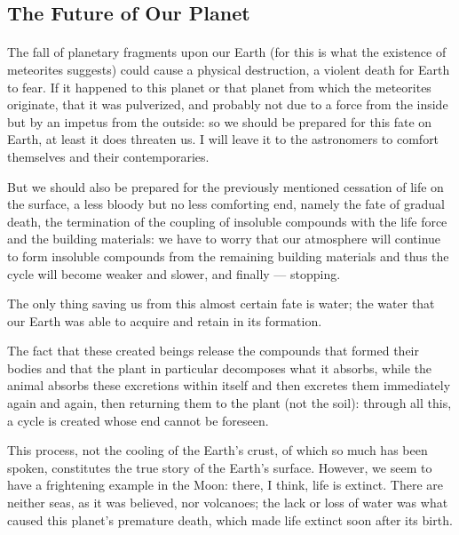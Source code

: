 \documentclass[a4paper, 12pt, oneside]{article}
\begin{document}
\subsection{The Future of Our Planet}
\paragraph*{}
The fall of planetary fragments upon our Earth (for this is what the existence of meteorites suggests) could cause a physical destruction, a violent death for Earth to fear. If it happened to this planet or that planet from which the meteorites originate, that it was pulverized, and probably not due to a force from the inside but by an impetus from the outside: so we should be prepared for this fate on Earth, at least it does threaten us. I will leave it to the astronomers to comfort themselves and their contemporaries.

But we should also be prepared for the previously mentioned cessation of life on the surface, a less bloody but no less comforting end, namely the fate of gradual death, the termination of the coupling of insoluble compounds with the life force and the building materials: we have to worry that our atmosphere will continue to form insoluble compounds from the remaining building materials and thus the cycle will become weaker and slower, and finally --- stopping.

The only thing saving us from this almost certain fate is water; the water that our Earth was able to acquire and retain in its formation.

The fact that these created beings release the compounds that formed their bodies and that the plant in particular decomposes what it absorbs, while the animal absorbs these excretions within itself and then excretes them immediately again and again, then returning them to the plant (not the soil): through all this, a cycle is created whose end cannot be foreseen.

This process, not the cooling of the Earth's crust, of which so much has been spoken, constitutes the true story of the Earth's surface. However, we seem to have a frightening example in the Moon: there, I think, life is extinct. There are neither seas, as it was believed, nor volcanoes; the lack or loss of water was what caused this planet's premature death, which made life extinct soon after its birth.
\end{document}
